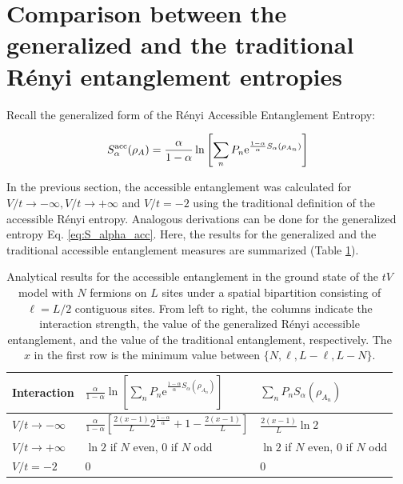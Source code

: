 \section{Comparison between the generalized and the traditional R\'enyi entanglement entropies}

Recall the generalized form of the R\'enyi Accessible Entanglement Entropy:

\begin{equation}
S_{\alpha}^{{\rm acc}} (\rho_A) = \frac{\alpha}{1-\alpha}\ln\left[ \sum_{n} P_n \mathrm{e}^{\frac{1-\alpha}{\alpha} S_{\alpha}(\rho_{A_n})}\right]
\label{eq:S_alpha_acc}
\end{equation} 

In the previous section, the accessible entanglement was calculated for $V/t \to -\infty, V/t \to +\infty$ and $V/t = -2$ using the traditional definition of the accessible R\'enyi entropy. Analogous derivations can be done for the generalized entropy Eq. \ref{eq:S_alpha_acc}. Here, the results for the generalized and the traditional accessible entanglement measures are summarized (Table \ref{tab:Limits}).



%
\begin{table}[htp]
\begin{center}
   \renewcommand{\arraystretch}{1.8}
   \setlength\tabcolsep{8pt}
 \begin{tabular}{@{}lll@{}} 
  \toprule
    Interaction	& $\frac{\alpha}{1-\alpha}\ln\left[ \sum_{n} P_n \mathrm{e}^{\frac{1-\alpha}{\alpha} S_{\alpha}(\rho_{A_n})}\right]$ & $ \sum_{n} P_n S_{\alpha}(\rho_{A_n})$ \\ 
   \midrule
   $V/t \to -\infty$ & $ \frac{\alpha}{1-\alpha} \left[ \frac{2(x-1)}{L} 2^{\frac{1-\alpha}{\alpha}} + 1 - \frac{2(x-1)}{L} \right]$ & $\frac{2(x-1)}{L} \ln{2}$ \\
   $V/t \to +\infty$ & $\ln{2}$ if $N$ even, $0$ if $N$ odd &  $\ln{2}$ if $N$ even, $0$ if $N$ odd \\
   $V/t = -2$ & $0$ & $0$\\
    \bottomrule
    \end{tabular}
\end{center}
\caption{\label{tab:Limits} 
Analytical results for the accessible entanglement in the ground state of the $tV$ model with $N$ fermions on $L$ sites under a spatial bipartition consisting of $\ell=L/2$ contiguous sites. From left to right, the columns indicate the interaction strength, the value of the generalized R\'enyi accessible entanglement, and the value of the traditional entanglement, respectively. The $x$ in the first row is the minimum value between $ \{ N, \ell, L-\ell, L-N \} $.}
\end{table}
%

